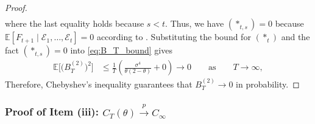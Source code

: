 \documentclass[a4paper, 11pt]{article}
\newcommand{\E}{\mathbb E}
\newcommand{\T}{\mathcal E}
\theoremstyle{definition}
\begin{document}
\begin{proof}
\begin{align}
	\end{align}
	where the last equality holds because $s < t$.
    Thus, we have $(*_{t,s}) = 0$ because $\E[ F_{t+1} \mid \T_1, \dots, \T_{t} ] = 0$ according to .
	Substituting the bound for $(*_t)$ and the fact $(*_{t,s}) = 0$ into \eqref{eq:B_T_bound} gives
	\begin{align}
		\E\big[ \big( B_T^{(2)} \big)^2 \big] & \le \frac{1}{T} \left( \frac{\sigma^4}{\theta (2 - \theta)} + 0 \right) \longrightarrow 0 \qquad \text{as} \qquad T \longrightarrow \infty ,
	\end{align}
	Therefore, Chebyshev's inequality guarantees that $B_T^{(2)} \to 0$ in probability.
\end{proof}



\subsubsection{Proof of Item (iii): $C_T(\theta) \overset{p}{\longrightarrow} C_\infty$} \label{apx:proof_C_T_convergence}
\end{document}
